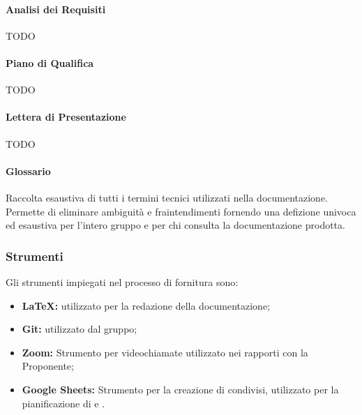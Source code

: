 \paragraph{Analisi dei Requisiti}
TODO

\paragraph{Piano di Qualifica}
TODO

\paragraph{Lettera di Presentazione}
TODO

\paragraph{Glossario}
Raccolta esaustiva di tutti i termini tecnici utilizzati nella documentazione. Permette di eliminare ambiguità e fraintendimenti fornendo una defizione univoca ed esaustiva per l'intero gruppo e per chi consulta la documentazione prodotta.




\subsubsection{Strumenti}
Gli strumenti impiegati nel processo di fornitura sono:
\begin{itemize}
  \item \textbf{LaTeX:}  utilizzato per la redazione della documentazione;
  \item \textbf{Git:}  utilizzato dal gruppo;
  \item \textbf{Zoom:} Strumento per videochiamate utilizzato nei rapporti con la Proponente;
  \item \textbf{Google Sheets:} Strumento per la creazione di  condivisi, utilizzato per la pianificazione di  e .
\end{itemize}
